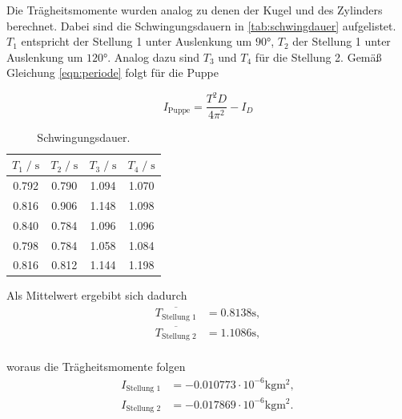 Die Trägheitsmomente wurden analog zu denen der Kugel und des Zylinders berechnet. Dabei sind die Schwingungsdauern in \autoref{tab:schwingdauer}
aufgelistet.
$T_1$ entspricht der Stellung 1 unter Auslenkung um $90°$, $T_2$ der Stellung 1 unter Auslenkung um $120°$.
Analog dazu sind $T_3$ und $T_4$ für die Stellung 2. Gemäß Gleichung \autoref{eqn:periode} folgt für die Puppe


\begin{equation*}
  I_{\text{Puppe}} = \frac{T^2D}{4\pi^2} - I_D
\end{equation*}

\begin{table}[H]
    \centering
        \caption{Schwingungsdauer.}
        \label{tab:schwingdauer}
        \begin{tabular}{c c c c}
        \toprule
        $T_1 \;/\; \si{\second}$ & $T_2 \;/\; \si{\second}$ & $T_3 \;/\; \si{\second}$ & $T_4 \;/\; \si{\second}$ \\
        \midrule
        0.792 & 0.790 & 1.094 & 1.070 \\
        0.816 & 0.906 & 1.148 & 1.098 \\
        0.840 & 0.784 & 1.096 & 1.096 \\
        0.798 & 0.784 & 1.058 & 1.084 \\
        0.816 & 0.812 & 1.144 & 1.198 \\
        \bottomrule
    \end{tabular}
\end{table}


Als Mittelwert ergebibt sich dadurch
\begin{align*}
  \overline{T_{\text{Stellung 1}}} &= 0.8138 \si{\second}, \\
  \overline{T_{\text{Stellung 2}}} &= 1.1086 \si{\second}, \\
\end{align*}


woraus die Trägheitsmomente folgen %
\begin{align*}
  I_{\text{Stellung 1}} &= -0.010773 \cdot 10^{-6} \si{\kilogram\meter^2}, \\
  I_{\text{Stellung 2}} &= -0.017869 \cdot 10^{-6} \si{\kilogram\meter^2}. \\
\end{align*}



